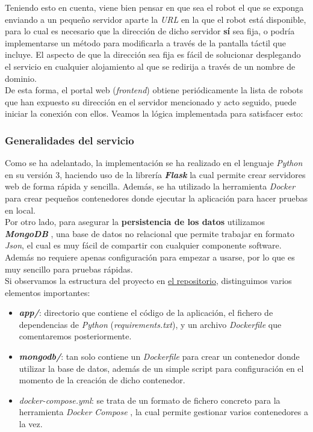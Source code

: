 Teniendo esto en cuenta, viene bien pensar en que sea el robot el que se exponga enviando a un pequeño servidor aparte la \textit{URL} en la que el robot está disponible, para lo cual es necesario que la dirección de dicho servidor \textbf{sí} sea fija, o podría implementarse un método para modificarla a través de la pantalla táctil que incluye. El aspecto de que la dirección sea fija es fácil de solucionar desplegando el servicio en cualquier alojamiento al que se redirija a través de un nombre de dominio.\\

De esta forma, el portal web (\textit{frontend}) obtiene periódicamente la lista de robots que han expuesto su dirección en el servidor mencionado y acto seguido, puede iniciar la conexión con ellos. Veamos la lógica implementada para satisfacer esto:\\

\subsubsection{Generalidades del servicio}

Como se ha adelantado, la implementación se ha realizado en el lenguaje \textit{Python} en su versión 3, haciendo uso de la librería \textbf{\textit{Flask}} \cite{flask} la cual permite crear servidores web de forma rápida y sencilla. Además, se ha utilizado la herramienta \textit{Docker} para crear pequeños contenedores donde ejecutar la aplicación para hacer pruebas en local.\\

Por otro lado, para asegurar la \textbf{persistencia de los datos} utilizamos \textbf{\textit{MongoDB}} \cite{mongodb}, una base de datos no relacional que permite trabajar en formato \textit{Json}, el cual es muy fácil de compartir con cualquier componente software. Además no requiere apenas configuración para empezar a usarse, por lo que es muy sencillo para pruebas rápidas.\\

Si observamos la estructura del proyecto en \href{https://github.com/adrianmorente/lazarillo-admin-backend}{el repositorio}, distinguimos varios elementos importantes:

\begin{itemize}
	\item \textbf{\textit{app/}}: directorio que contiene el código de la aplicación, el fichero de dependencias de \textit{Python} (\textit{requirements.txt}), y un archivo \textit{Dockerfile} que comentaremos posteriormente.
	\item \textbf{\textit{mongodb/}}: tan solo contiene un \textit{Dockerfile} para crear un contenedor donde utilizar la base de datos, además de un simple script para configuración en el momento de la creación de dicho contenedor.
	\item \textit{docker-compose.yml}: se trata de un formato de fichero concreto para la herramienta \textit{Docker Compose} \cite{docker-compose}, la cual permite gestionar varios contenedores a la vez.
\end{itemize}

